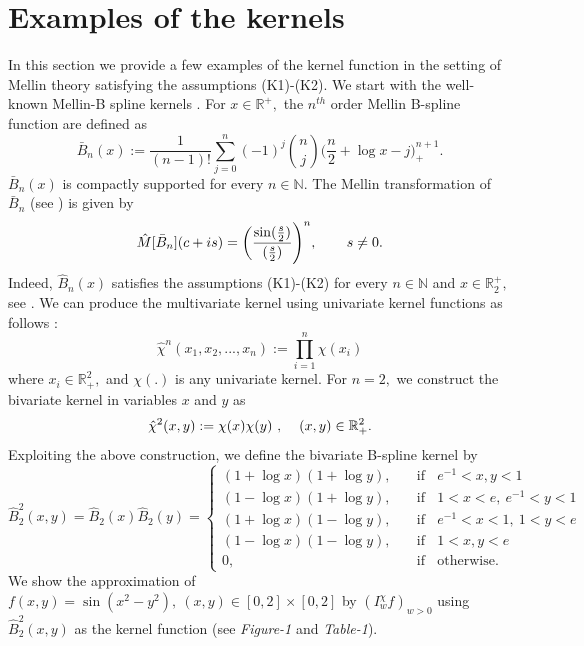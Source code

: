 \documentclass[12pt]{article}
\begin{document}
{\section{Examples of the kernels}
In this section we provide a few examples of the kernel function in the setting of Mellin theory satisfying the assumptions (K1)-(K2). We start with the well-known Mellin-B spline kernels \cite{bardaro9,bardaro7}. For $ x \in \mathbb{R}^{+},$ the $n^{th}$ order Mellin B-spline function are defined as
$$\bar{B}_{n}(x):= \frac{1}{(n-1)!} \sum_{j=0}^{n} (-1)^{j} {n \choose j} \bigg( \frac{n}{2}+\log x-j \bigg)_{+}^{n+1}.$$
$\bar{B}_{n}(x) $ is compactly supported for every $ n \in \mathbb{N}.$ The Mellin transformation of $\bar{B}_{n}$ (see \cite{bardaro7}) is given by
\begin{eqnarray} \label{splinefourier}
\hat{M}[\bar{B}_{n}](c+is) = \bigg( \frac{\sin(\frac{s}{2})}{(\frac{s}{2})} \Bigg)^{n},  \ \ \hspace{0.5cm} s \neq 0.
\end{eqnarray}
Indeed, $\hat{B}_{n}(x)$ satisfies the assumptions (K1)-(K2) for every $n \in \mathbb{N}$ and $x \in \mathbb{R}_{2}^+,$ see \cite{bardaro7,own} .
We can produce the multivariate kernel using univariate kernel functions as follows :
$$ \hat{\chi}^{n}(x_{1},x_{2},...,x_{n}) := \prod_{i=1}^{n} \chi(x_{i})$$
where $ x_{i} \in \mathbb{R}_{+}^{2},$ and $\chi(.)$ is any univariate kernel. For $n=2,$ we construct the bivariate kernel in variables $x$ and $y$ as
$$ \hat{\chi}^{2}(x,y) := \chi(x) \chi(y)\ , \hspace{0.4cm}(x, y) \in \mathbb{R}_{+}^{2}.$$
Exploiting the above construction, we define the bivariate B-spline kernel by
\begin{equation*}
\hat{B}_{2}^{2}(x,y)=\hat{B}_{2}(x)\hat{B}_{2}(y) =
     \begin{cases}

     {(1+\log x)(1+\log y),} &\quad\text{if} \ \ \ \ { e^{-1} < x,y < 1}\\
       {(1-\log x)(1+\log y),} &\quad\text{if} \ \ \ \ { 1 < x <e,\ e^{-1} < y < 1} \\
       {(1+\log x)(1-\log y),} &\quad\text{if} \ \ \ \ { e^{-1} < x < 1,\ 1 < y <e} \\
       {(1-\log x)(1-\log y),} &\quad\text{if} \ \ \ \ { 1 < x,y <e} \\
       {0,} &\quad\text{if} \ \ \ \ { \text{otherwise}.}
   \end{cases}
\end{equation*}
We show the approximation of $f(x,y)= \sin(x^{2}-y^{2}),\ (x,y)\in [0,2]\times[0,2]$ by $(I_{w}^{\chi}f)_{w>0}$ using $\hat{B}_{2}^{2}(x,y)$ as the kernel function (see \textit{Figure-1} and \textit{Table-1}).

}
\end{document}
